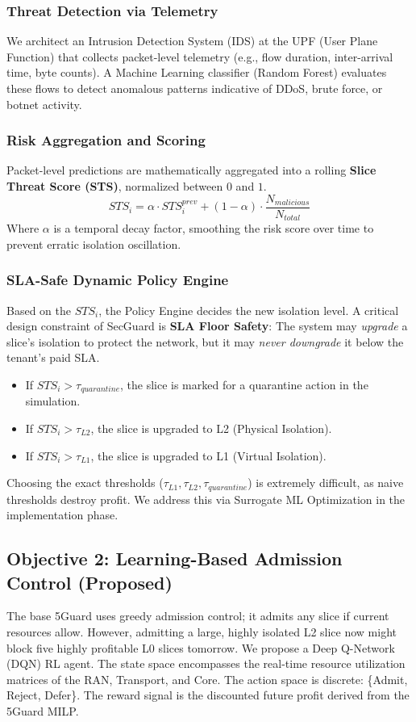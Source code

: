 \subsubsection{Threat Detection via Telemetry}
We architect an Intrusion Detection System (IDS) at the UPF (User Plane Function) that collects packet-level telemetry (e.g., flow duration, inter-arrival time, byte counts). A Machine Learning classifier (Random Forest) evaluates these flows to detect anomalous patterns indicative of DDoS, brute force, or botnet activity.

\subsubsection{Risk Aggregation and Scoring}
Packet-level predictions are mathematically aggregated into a rolling \textbf{Slice Threat Score (STS)}, normalized between $0$ and $1$. 
\begin{equation}
    STS_i = \alpha \cdot STS_{i}^{prev} + (1 - \alpha) \cdot \frac{N_{malicious}}{N_{total}}
\end{equation}
Where $\alpha$ is a temporal decay factor, smoothing the risk score over time to prevent erratic isolation oscillation.

\subsubsection{SLA-Safe Dynamic Policy Engine}
Based on the $STS_i$, the Policy Engine decides the new isolation level. A critical design constraint of SecGuard is \textbf{SLA Floor Safety}: The system may \textit{upgrade} a slice's isolation to protect the network, but it may \textit{never downgrade} it below the tenant's paid SLA. 
\begin{itemize}
    \item If $STS_i > \tau_{quarantine}$, the slice is marked for a quarantine action in the simulation.
    \item If $STS_i > \tau_{L2}$, the slice is upgraded to L2 (Physical Isolation).
    \item If $STS_i > \tau_{L1}$, the slice is upgraded to L1 (Virtual Isolation).
\end{itemize}
Choosing the exact thresholds ($\tau_{L1}, \tau_{L2}, \tau_{quarantine}$) is extremely difficult, as naive thresholds destroy profit. We address this via Surrogate ML Optimization in the implementation phase.

\subsection{Objective 2: Learning-Based Admission Control (Proposed)}
The base 5Guard uses greedy admission control; it admits any slice if current resources allow. However, admitting a large, highly isolated L2 slice now might block five highly profitable L0 slices tomorrow. We propose a Deep Q-Network (DQN) RL agent. The state space encompasses the real-time resource utilization matrices of the RAN, Transport, and Core. The action space is discrete: \{Admit, Reject, Defer\}. The reward signal is the discounted future profit derived from the 5Guard MILP.

